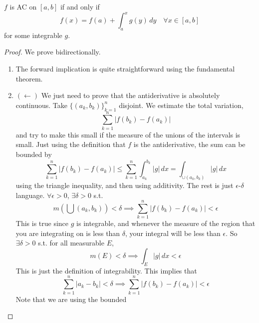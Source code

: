   \begin{corollary}
    $f$ is AC on $[a, b]$ if and only if 
    \begin{equation}
      f(x) = f(a) + \int_a^x g(y) \,dy \quad \forall x \in [a, b]
    \end{equation}
    for some integrable $g$. 
  \end{corollary}
  \begin{proof}
    We prove bidirectionally. 
    \begin{enumerate}
      \item The forward implication is quite straightforward using the fundamental theorem. 
      \item $(\leftarrow)$ We just need to prove that the antiderivative is absolutely continuous. Take $\{(a_k, b_k)\}_{k=1}^n$ disjoint. We estimate the total variation,
        \begin{equation}
          \sum_{k=1}^n |f(b_k) - f(a_k)| 
        \end{equation}
        and try to make this small if the measure of the unions of the intervals is small. Just using the definition that $f$ is the antiderivative, the sum can be bounded by 
        \begin{equation}
          \sum_{k=1}^n |f(b_k) - f(a_k)| \leq \sum_{k=1}^n \int_{a_k}^{b_k} |g| \,dx = \int_{\cup (a_k, b_k)} |g| \,dx 
        \end{equation}
        using the triangle inequality, and then using additivity. The rest is just $\epsilon$-$\delta$ language. $\forall \epsilon > 0$, $\exists \delta > 0$ s.t. 
        \begin{equation}
          m(\bigcup (a_k, b_k)) < \delta \implies \sum_{k=1}^n |f(b_k) - f(a_k)| < \epsilon
        \end{equation}
        This is true since $g$ is integrable, and whenever the measure of the region that you are integrating on is less than $\delta$, your integral will be less than $\epsilon$. So $\exists \delta > 0$ s.t. for all measurable $E$, 
        \begin{equation}
          m(E) < \delta \implies \int_E |g| \,dx < \epsilon
        \end{equation}
        This is just the definition of integrability. This implies that 
        \begin{equation}
          \sum_{k=1}^n |a_k - b_k| < \delta \implies \sum_{k=1}^n |f(b_k) - f(a_k)| < \epsilon 
        \end{equation}
        Note that we are using the bounded 
    \end{enumerate}
  \end{proof}

